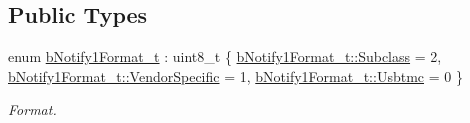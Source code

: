 \subsection*{Public Types}
\begin{DoxyCompactItemize}
\item 
enum \hyperlink{classmdt_usbtmc_interrupt_transfer_ae547608f6ca182cc8312a8f4cbf8b2f1}{b\-Notify1\-Format\-\_\-t} \-: uint8\-\_\-t \{ \hyperlink{classmdt_usbtmc_interrupt_transfer_ae547608f6ca182cc8312a8f4cbf8b2f1aaee92af542a084a7454b6871fa5d9eeb}{b\-Notify1\-Format\-\_\-t\-::\-Subclass} = 2, 
\hyperlink{classmdt_usbtmc_interrupt_transfer_ae547608f6ca182cc8312a8f4cbf8b2f1a4cc449f0ef9a4d1671ae565a323d06c1}{b\-Notify1\-Format\-\_\-t\-::\-Vendor\-Specific} = 1, 
\hyperlink{classmdt_usbtmc_interrupt_transfer_ae547608f6ca182cc8312a8f4cbf8b2f1a7dec96c555a3a0b814a35584fa1e320f}{b\-Notify1\-Format\-\_\-t\-::\-Usbtmc} = 0
 \}
\begin{DoxyCompactList}\small\item\em Format. \end{DoxyCompactList}\end{DoxyCompactItemize}
